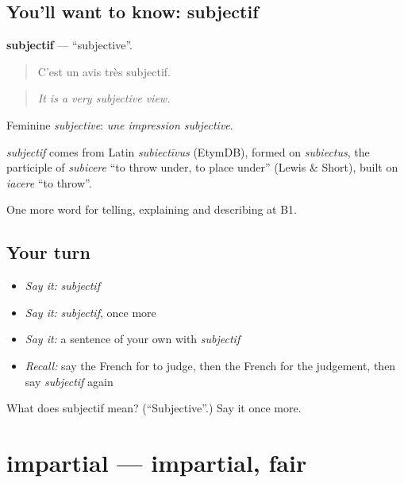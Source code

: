 \subsection*{You'll want to know: subjectif}
\textbf{subjectif} — \textquotedblleft{}subjective\textquotedblright{}.

\begin{quote}
C'est un avis très subjectif.
\end{quote}

\begin{quote}
\emph{It is a very subjective view.}
\end{quote}

Feminine \emph{subjective}: \emph{une impression subjective}.

\begin{cousinweb}
\emph{subjectif} comes from Latin \emph{subiectīvus} (EtymDB), formed on \emph{subiectus}, the participle of \emph{subicere} \textquotedblleft{}to throw under, to place under\textquotedblright{} (Lewis \& Short), built on \emph{iacere} \textquotedblleft{}to throw\textquotedblright{}.
\end{cousinweb}

\begin{grammarlens}[title={What you've built}]
One more word for telling, explaining and describing at B1.
\end{grammarlens}

\subsection*{Your turn}
\begin{itemize}
\raggedright
  \item \emph{Say it:} \emph{subjectif}
  \item \emph{Say it:} \emph{subjectif}, once more
  \item \emph{Say it:} a sentence of your own with \emph{subjectif}
  \item \emph{Recall:} say the French for to judge, then the French for the judgement, then say \emph{subjectif} again
\end{itemize}

\begin{tcolorbox}[breakable,colback=teal!4,colframe=teal!35!black,title={Before you move on}]
What does subjectif mean? (\textquotedblleft{}Subjective\textquotedblright{}.) Say it once more.
\end{tcolorbox}
\section[impartial]{impartial — impartial, fair}

